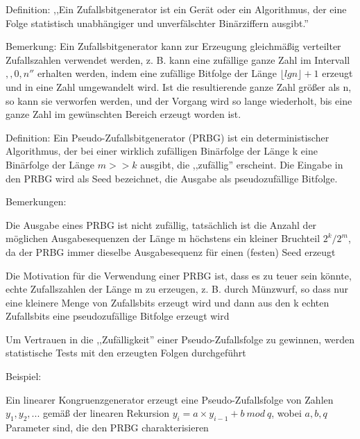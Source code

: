 \documentclass[a4paper]{article}
\begin{document}
\begin{multicols}{3}
      \begin{itemize*}
            \item Definition: ,,Ein Zufallsbitgenerator ist ein Gerät oder ein
            Algorithmus, der eine Folge statistisch unabhängiger und
            unverfälschter Binärziffern ausgibt.''
            \item Bemerkung: Ein Zufallsbitgenerator kann zur Erzeugung gleichmäßig
            verteilter Zufallszahlen verwendet werden, z. B. kann eine zufällige
            ganze Zahl im Intervall $,,0,n''$ erhalten werden, indem eine
            zufällige Bitfolge der Länge $\lfloor lg
                  n\rfloor+1$ erzeugt und in eine Zahl umgewandelt wird.
            Ist die resultierende ganze Zahl größer als n, so kann sie verworfen
            werden, und der Vorgang wird so lange wiederholt, bis eine ganze Zahl
            im gewünschten Bereich erzeugt worden ist.
            \item Definition: Ein Pseudo-Zufallsbitgenerator (PRBG) ist ein
            deterministischer Algorithmus, der bei einer wirklich zufälligen
            Binärfolge der Länge k eine Binärfolge der Länge
            $m>> k$ ausgibt, die ,,zufällig'' erscheint.
            Die Eingabe in den PRBG wird als Seed bezeichnet, die Ausgabe als
            pseudozufällige Bitfolge.
            \item Bemerkungen:
            \begin{itemize*}
                  \item Die Ausgabe eines PRBG ist nicht zufällig, tatsächlich ist die Anzahl der möglichen Ausgabesequenzen der Länge m höchstens ein kleiner Bruchteil $2^k/2^m$, da der PRBG immer dieselbe Ausgabesequenz für einen (festen) Seed erzeugt
                  \item Die Motivation für die Verwendung einer PRBG ist, dass es zu teuer sein könnte, echte Zufallszahlen der Länge m zu erzeugen, z. B. durch Münzwurf, so dass nur eine kleinere Menge von Zufallsbits erzeugt wird und dann aus den k echten Zufallsbits eine pseudozufällige Bitfolge erzeugt wird
                  \item Um Vertrauen in die ,,Zufälligkeit'' einer Pseudo-Zufallsfolge zu gewinnen, werden statistische Tests mit den erzeugten Folgen durchgeführt
            \end{itemize*}
            \item Beispiel:
            \begin{itemize*}
                  \item Ein linearer Kongruenzgenerator erzeugt eine Pseudo-Zufallsfolge von Zahlen $y_1,y_2, ...$ gemäß der linearen Rekursion $y_i= a\times y_{i-1} + b\ mod\ q$, wobei $a, b, q$ Parameter sind, die den PRBG charakterisieren

\end{itemize*}
\end{itemize*}
\end{multicols}
\end{document}
